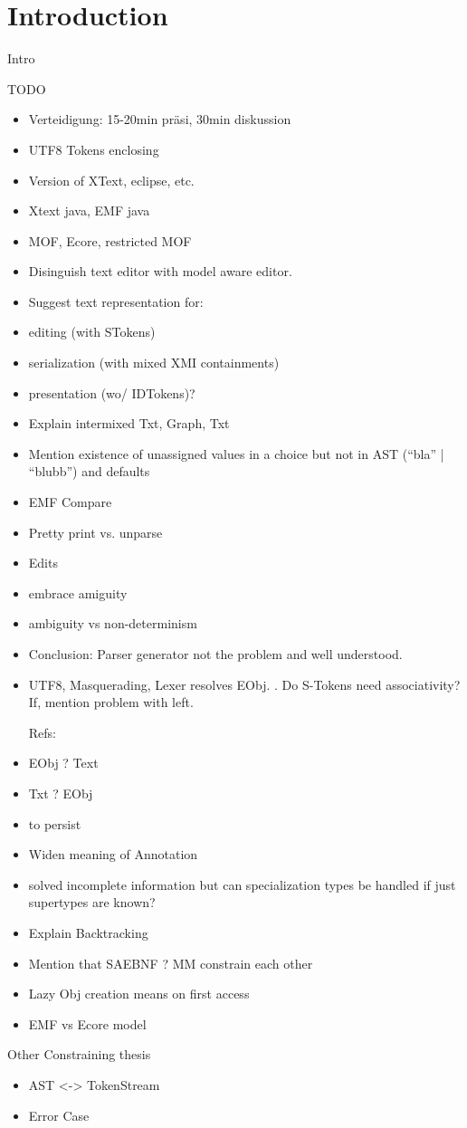 \chapter{Introduction}
\label{cha:introduction}
Intro

TODO
\begin{itemize}
	\item Verteidigung: 15-20min präsi, 30min diskussion
	\item UTF8 Tokens enclosing
	\item Version of XText, eclipse, etc.
	\item Xtext java, EMF java
	\item MOF, Ecore, restricted MOF 
	\item Disinguish text editor with model aware editor.
	\item Suggest text representation for: 
	\item editing (with STokens)
	\item serialization (with mixed XMI containments)
	\item presentation (wo/ IDTokens)?
	\item Explain intermixed Txt, Graph, Txt
	\item Mention existence of unassigned values in a choice but not in AST (“bla” | “blubb”) and defaults
	\item EMF Compare
	\item Pretty print vs. unparse
	\item Edits
	\item embrace amiguity
	\item ambiguity vs non-determinism
	\item Conclusion: Parser generator not the problem and well understood.
	\item UTF8, Masquerading, Lexer resolves EObj. . Do S-Tokens need associativity? If, mention problem with left.

Refs:
	\item EObj ? Text
	\item Txt ? EObj
	\item to persist
	\item Widen meaning of Annotation
	\item solved incomplete information but can specialization types be handled if just supertypes are known? 
	\item Explain Backtracking
	\item Mention that SAEBNF ? MM constrain each other
	\item Lazy Obj creation means on first access
	\item EMF vs Ecore model
\end{itemize}
Other Constraining thesis
\begin{itemize}
	\item AST <-> TokenStream
	\item Error Case
\end{itemize}
